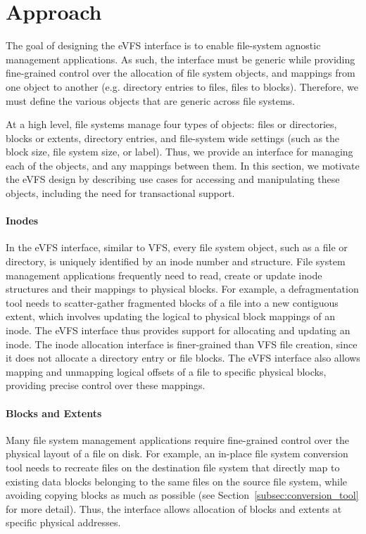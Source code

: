 \vspace{-0.5em}
\section{Approach\label{sec:Approach}}

The goal of designing the eVFS interface is to enable file-system agnostic management applications. As such, the interface must be generic while providing fine-grained control over the allocation of file system objects, and mappings from one object to another (e.g. directory entries to files, files to blocks). Therefore, we must define the various objects that are generic across file systems.

At a high level, file systems manage four types of objects: files or directories, blocks or extents, directory entries, and file-system wide settings (such as the block size, file system size, or label). Thus, we provide an interface for managing each of the objects, and any mappings between them. In this section, we motivate the eVFS design by describing use cases for accessing and manipulating these objects, including the need for transactional support.

\paragraph{Inodes} In the eVFS interface, similar to VFS, every file system object, such as a file or directory, is uniquely identified by an inode number and structure. File system management applications frequently need to read, create or update inode structures and their mappings to physical blocks. For example, a defragmentation tool needs to scatter-gather fragmented blocks of a file into a new contiguous extent, which involves updating the logical to physical block mappings of an inode. The eVFS interface thus provides support for allocating and updating an inode. The inode allocation interface is finer-grained than VFS file creation, since it does not allocate a directory entry or file blocks. The eVFS interface also allows mapping and unmapping logical offsets of a file to specific physical blocks, providing precise control over these mappings.

\paragraph{Blocks and Extents} Many file system management applications require fine-grained control over the physical layout of a file on disk. For example, an in-place file system conversion tool needs to recreate files on the destination file system that directly map to existing data blocks belonging to the same files on the source file system, while avoiding copying blocks as much as possible (see Section~\ref{subsec:conversion_tool} for more detail). Thus, the interface allows allocation of blocks and extents at specific physical addresses.

